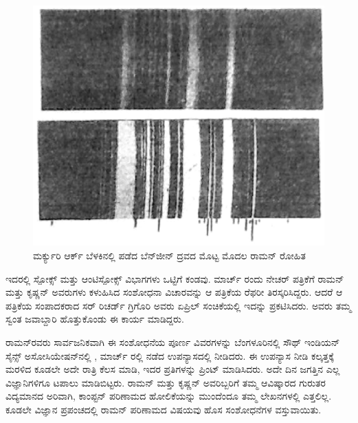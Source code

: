 \begin{figure}[!htbp]
\includegraphics[scale=0.19]{"images/2a.jpg"}
\caption{ಮರ್ಕ್ಯುರಿ ಆರ್ಕ್ ಬೆಳಕಿನಲ್ಲಿ ಪಡೆದ ಬೆನ್‍ಜೀನ್ ದ್ರವದ ಮೊಟ್ಟ ಮೊದಲ ರಾಮನ್ ರೋಹಿತ\\}
\end{figure}

ಇದರಲ್ಲಿ ಸ್ಪೋಕ್ಸ್ ಮತ್ತು ಆಂಟಿಸ್ಪೋಕ್ಸ್ ವಿಭಾಗಗಳು ಒಟ್ಟಿಗೆ ಕಂಡವು.  ಮಾರ್ಚ್ ರಂದು ನೇಚರ್ ಪತ್ರಿಕೆಗೆ ರಾಮನ್ ಮತ್ತು ಕೃಷ್ಣನ್ ಅವರುಗಳು ಕಳುಹಿಸಿದ ಸಂಶೋಧನಾ ವಿಚಾರವನ್ನು ಆ ಪತ್ರಿಕೆಯ ರೆಫರೀ ತಿರಸ್ಕರಿಸಿದ್ದರು. ಆದರೆ ಆ ಪತ್ರಿಕೆಯ ಸಂಪಾದಕರಾದ ಸರ್ ರಿಚರ್ಡ್ ಗ್ರಿಗೊರಿ ಅವರು  ಏಪ್ರಿಲ್ ಸಂಚಿಕೆಯಲ್ಲಿ ಇದನ್ನು ಪ್ರಕಟಿಸಿದರು. ಅವರು ತಮ್ಮ ಸ್ವಂತ ಜವಾಬ್ದಾರಿ ಹೊತ್ತುಕೊಂಡು ಈ ಕಾರ್ಯ ಮಾಡಿದ್ದರು.

ರಾಮನ್‍ರವರು ಸಾರ್ವಜನಿಕವಾಗಿ ಈ ಸಂಶೋಧನೆಯ ಪೂರ್ಣ ವಿವರಗಳನ್ನು ಬೆಂಗಳೂರಿನಲ್ಲಿ ಸೌಥ್ ಇಂಡಿಯನ್ ಸೈನ್ಸ್ ಅಸೋಸಿಯೇಷನ್‍ನಲ್ಲಿ ,  ಮಾರ್ಚ್ ರಲ್ಲಿ ನಡೆದ ಉಪನ್ಯಾಸದಲ್ಲಿ ನೀಡಿದರು. ಈ ಉಪನ್ಯಾಸ ನೀಡಿ ಕಲ್ಕತ್ತಕ್ಕೆ ಮರಳಿದ ಕೂಡಲೇ ಅದೇ ರಾತ್ರಿ ಕೆಲಸ ಮಾಡಿ, ಇದರ  ಪ್ರತಿಗಳನ್ನು ಪ್ರಿಂಟ್ ಮಾಡಿಸಿದರು. ಅದೇ ದಿನ ಜಗತ್ತಿನ ಎಲ್ಲ ವಿಜ್ಞಾನಿಗಳಿಗೂ ಟಪಾಲು ಮಾಡಿಬಿಟ್ಟರು. ರಾಮನ್ ಮತ್ತು ಕೃಷ್ಣನ್ ಅವರಿಬ್ಬರಿಗೆ ತಮ್ಮ ಆವಿಷ್ಕಾರದ ಗುರುತರ ವಿದ್ಯಮಾನದ ಅರಿವಾಗಿ, ಕಾಂಪ್ಟನ್ ಪರಿಣಾಮದ ಹೋಲಿಕೆಯನ್ನು ಮುಂದೆಂದೂ ತಮ್ಮ ಲೇಖನಗಳಲ್ಲಿ ಎತ್ತಲಿಲ್ಲ. ಕೂಡಲೇ ವಿಜ್ಞಾನ ಪ್ರಪಂಚದಲ್ಲಿ ರಾಮನ್ ಪರಿಣಾಮದ ವಿಷಯವು ಹೊಸ ಸಂಶೋಧನೆಗಳ ವಸ್ತುವಾಯಿತು.

